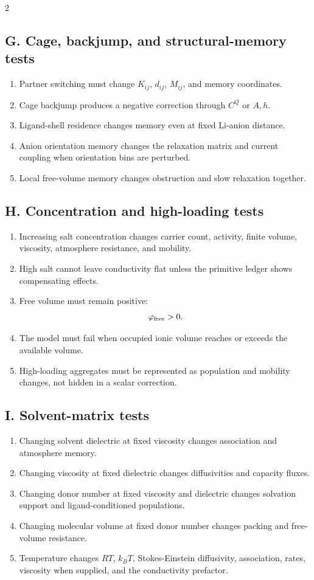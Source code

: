 \documentclass[10pt]{article}
\begin{document}
\begin{multicols}{2}
\subsection{G. Cage, backjump, and structural-memory tests}

\begin{enumerate}
\item Partner switching must change \(K_{ij}\), \(d_{ij}\), \(M_{ij}\), and
memory coordinates.
\item Cage backjump produces a negative correction through \(C^Q\) or \(A,h\).
\item Ligand-shell residence changes memory even at fixed Li-anion distance.
\item Anion orientation memory changes the relaxation matrix and current
coupling when orientation bins are perturbed.
\item Local free-volume memory changes obstruction and slow relaxation together.
\end{enumerate}

\subsection{H. Concentration and high-loading tests}

\begin{enumerate}
\item Increasing salt concentration changes carrier count, activity, finite
volume, viscosity, atmosphere resistance, and mobility.
\item High salt cannot leave conductivity flat unless the primitive ledger
shows compensating effects.
\item Free volume must remain positive:
\[
\varphi_{\rm free}>0.
\]
\item The model must fail when occupied ionic volume reaches or exceeds the
available volume.
\item High-loading aggregates must be represented as population and mobility
changes, not hidden in a scalar correction.
\end{enumerate}

\subsection{I. Solvent-matrix tests}

\begin{enumerate}
\item Changing solvent dielectric at fixed viscosity changes association and
atmosphere memory.
\item Changing viscosity at fixed dielectric changes diffusivities and capacity
fluxes.
\item Changing donor number at fixed viscosity and dielectric changes solvation
support and ligand-conditioned populations.
\item Changing molecular volume at fixed donor number changes packing and
free-volume resistance.
\item Temperature changes \(RT\), \(k_BT\), Stokes-Einstein diffusivity,
association, rates, viscosity when supplied, and the conductivity prefactor.
\end{enumerate}


\end{multicols}
\end{document}
